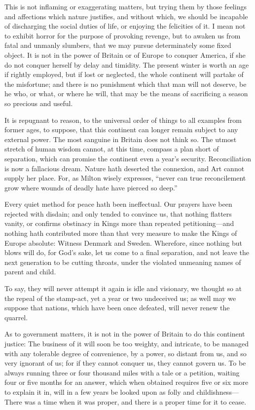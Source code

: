 \documentclass[12pt,oneside]{memoir}
\begin{document}
This is not inflaming or exaggerating matters, but trying them by
those feelings and affections which nature justifies, and without
which, we should be incapable of discharging the social duties of
life, or enjoying the felicities of it. I mean not to exhibit horror
for the purpose of provoking revenge, but to awaken us from fatal
and unmanly slumbers, that we may pursue determinately some fixed
object. It is not in the power of Britain or of Europe to conquer
America, if she do not conquer herself by delay and timidity. The
present winter is worth an age if rightly employed, but if lost or
neglected, the whole continent will partake of the misfortune; and
there is no punishment which that man will not deserve, be he who,
or what, or where he will, that may be the means of sacrificing a
season so precious and useful.

It is repugnant to reason, to the universal order of things to all
examples from former ages, to suppose, that this continent can
longer remain subject to any external power. The most sanguine in
Britain does not think so. The utmost stretch of human wisdom cannot,
at this time, compass a plan short of separation, which can promise
the continent even a year's security. Reconciliation is now a
fallacious dream. Nature hath deserted the connexion, and Art cannot
supply her place. For, as Milton wisely expresses, ``never can true
reconcilement grow where wounds of deadly hate have pierced so
deep.''

Every quiet method for peace hath been ineffectual. Our prayers have
been rejected with disdain; and only tended to convince us, that
nothing flatters vanity, or confirms obstinacy in Kings more than
repeated petitioning---and nothing hath contributed more than that
very measure to make the Kings of Europe absolute: Witness Denmark
and Sweden. Wherefore, since nothing but blows will do, for God's
sake, let us come to a final separation, and not leave the next
generation to be cutting throats, under the violated unmeaning names
of parent and child.

To say, they will never attempt it again is idle and visionary, we
thought so at the repeal of the stamp-act, yet a year or two
undeceived us; as well may we suppose that nations, which have been
once defeated, will never renew the quarrel.

As to government matters, it is not in the power of Britain to do
this continent justice: The business of it will soon be too weighty,
and intricate, to be managed with any tolerable degree of
convenience, by a power, so distant from us, and so very ignorant of
us; for if they cannot conquer us, they cannot govern us. To be
always running three or four thousand miles with a tale or a
petition, waiting four or five months for an answer, which when
obtained requires five or six more to explain it in, will in a few
years be looked upon as folly and childishness---There was a time
when it was proper, and there is a proper time for it to cease.
\end{document}
